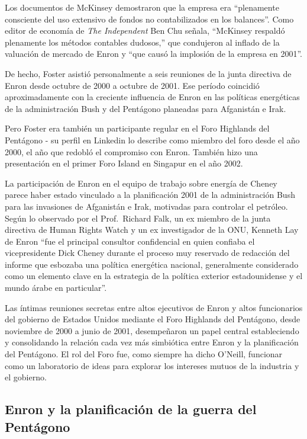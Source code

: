 \documentclass[10pt,a5paper,twoside,spanish,]{book}
\begin{document}
Los documentos de McKinsey demostraron que la empresa era ``plenamente
consciente del uso extensivo de fondos no contabilizados en los
balances''. Como editor de economía de \emph{The Independent} Ben Chu
señala, ``McKinsey respaldó plenamente los métodos contables dudosos,''
que condujeron al inflado de la valuación de mercado de Enron y ``que
causó la implosión de la empresa en 2001''.

De hecho, Foster asistió personalmente a seis reuniones de la junta
directiva de Enron desde octubre de 2000 a octubre de 2001. Ese período
coincidió aproximadamente con la creciente influencia de Enron en las
políticas energéticas de la administración Bush y del Pentágono
planeadas para Afganistán e Irak.

Pero Foster era también un participante regular en el Foro Highlands del
Pentágono - su perfil en Linkedin lo describe como miembro del foro
desde el año 2000, el año que redobló el compromiso con Enron. También
hizo una presentación en el primer Foro Island en Singapur en el año
2002.

La participación de Enron en el equipo de trabajo sobre energía de
Cheney parece haber estado vinculado a la planificación 2001 de la
administración Bush para las invasiones de Afganistán e Irak, motivadas
para controlar el petróleo. Según lo observado por el Prof.~Richard
Falk, un ex miembro de la junta directiva de Human Rights Watch y un ex
investigador de la ONU, Kenneth Lay de Enron ``fue el principal
consultor confidencial en quien confiaba el vicepresidente Dick Cheney
durante el proceso muy reservado de redacción del informe que esbozaba
una política energética nacional, generalmente considerado como un
elemento clave en la estrategia de la política exterior estadounidense y
el mundo árabe en particular''.

Las íntimas reuniones secretas entre altos ejecutivos de Enron y altos
funcionarios del gobierno de Estados Unidos mediante el Foro Highlands
del Pentágono, desde noviembre de 2000 a junio de 2001, desempeñaron un
papel central estableciendo y consolidando la relación cada vez más
simbiótica entre Enron y la planificación del Pentágono. El rol del Foro
fue, como siempre ha dicho O'Neill, funcionar como un laboratorio de
ideas para explorar los intereses mutuos de la industria y el gobierno.

\subsection{Enron y la planificación de la guerra del
Pentágono}\label{enron-y-la-planificaciuxf3n-de-la-guerra-del-pentuxe1gono}
\end{document}
